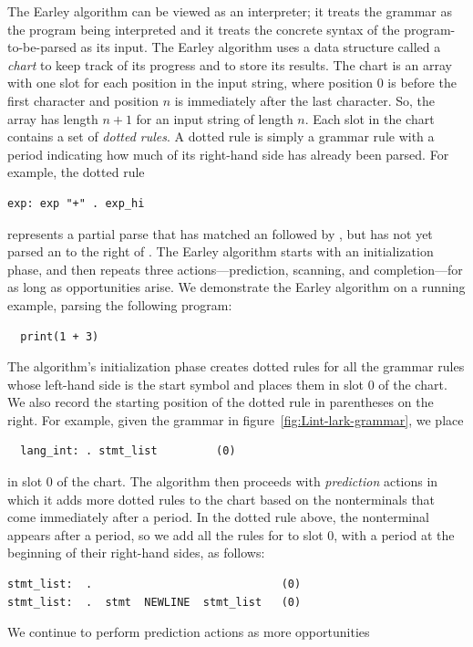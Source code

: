\documentclass[7x10]{TimesAPriori_MIT}%
\numberwithin{theorem}{chapter}
\numberwithin{definition}{chapter}
\numberwithin{equation}{chapter}
\begin{document}
{The Earley algorithm can be viewed as an interpreter; it treats the
grammar as the program being interpreted and it treats the concrete
syntax of the program-to-be-parsed as its input.  The Earley algorithm
uses a data structure called a \emph{chart} to
keep track of its progress and to store its results. The chart is an
array with one slot for each position in the input string, where
position $0$ is before the first character and position $n$ is
immediately after the last character. So, the array has length $n+1$
for an input string of length $n$. Each slot in the chart contains a
set of \emph{dotted rules}. A dotted rule is simply a grammar rule
with a period indicating how much of its right-hand side has already
been parsed. For example, the dotted rule
\begin{lstlisting}
exp: exp "+" . exp_hi
\end{lstlisting}
represents a partial parse that has matched an  followed by
\code{+}, but has not yet parsed an  to the right of
\code{+}.
%
The Earley algorithm starts with an initialization phase, and then
repeats three actions---prediction, scanning, and completion---for as
long as opportunities arise. We demonstrate the Earley algorithm on a
running example, parsing the following program:
\begin{lstlisting}
  print(1 + 3)
\end{lstlisting}
The algorithm's initialization phase creates dotted rules for all the
grammar rules whose left-hand side is the start symbol and places them
in slot $0$ of the chart. We also record the starting position of the
dotted rule in parentheses on the right. For example, given the
grammar in figure~\ref{fig:Lint-lark-grammar}, we place
\begin{lstlisting}
  lang_int: . stmt_list         (0)
\end{lstlisting}
in slot $0$ of the chart. The algorithm then proceeds with
\emph{prediction} actions in which it adds more dotted rules to the
chart based on the nonterminals that come immediately after a period. In
the dotted rule above, the nonterminal  appears after a period,
so we add all the rules for  to slot $0$, with a
period at the beginning of their right-hand sides, as follows:
\begin{lstlisting}
stmt_list:  .                             (0)
stmt_list:  .  stmt  NEWLINE  stmt_list   (0)
\end{lstlisting}
We continue to perform prediction actions as more opportunities
}
\end{document}

